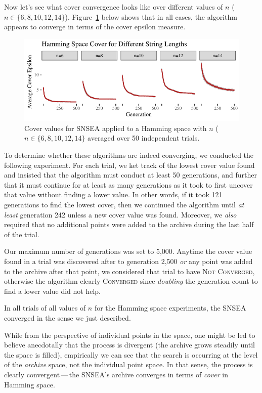 \documentclass[twoside]{article}
\begin{document}
Now let's see what cover convergence looks like over different values of $n$ ($n\in\{6, 8, 10, 12, 14\}$).  Figure~\ref{fig:hamming:nopop:sm} below shows that in all cases, the algorithm appears to converge in terms of the cover epsilon measure.
%
\begin{figure}[t]
\includegraphics[width=1\textwidth]{Figures/hamming-500sm-NOPOP.pdf}
\caption{\label{fig:hamming:nopop:sm} Cover values for SNSEA applied to a Hamming space with $n$ ($n\in\{6, 8, 10, 12, 14\}$ averaged over 50 independent trials.}
\end{figure}
%

To determine whether these algorithms are indeed converging, we conducted the following experiment.  For each trial, we ket track of the lowest cover value found and insisted that the algorithm must conduct at least 50 generations, and further that it must continue for at least as many generations as it took to first uncover that value without finding a lower value.  In other words, if it took 121 generations to find the lowest cover, then we continued the algorithm until \emph{at least} generation 242 unless a new cover value was found.  Moreover, we \emph{also} required that no additional points were added to the archive during the last half of the trial.

Our maximum number of generations was set to 5,000.  Anytime the cover value found in a trial was discovered after to generation 2,500 \emph{or} any point was added to the archive after that point, we considered that trial to have \textsc{Not Converged}, otherwise the algorithm clearly \textsc{Converged} since \emph{doubling} the generation count to find a lower value did not help.  

In all trials of all values of $n$  for the Hamming space experiments, the SNSEA converged in the sense we just described.

While from the perspective of individual points in the space, one might be led to believe anecdotally that the process is divergent (the archive grows steadily until the space is filled), empirically we can see that the search is occurring at the level of the \emph{archive} space, not the individual point space.  In that sense, the process is clearly convergent\,---\,the SNSEA's archive converges in terms of \emph{cover} in Hamming space.
\end{document}
